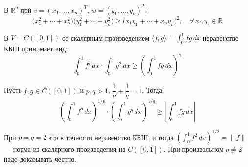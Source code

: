 \begin{examplelist}
    \item
    В $\mathbb{R}^n$ при $v = (x_1,\dots,x_n)^T$, $w = (y_1,\dots,y_n)^T$:
    \[
        \bigl(x_1^2 + \cdots + x_n^2\bigr)\bigl(y_1^2 + \cdots + y_n^2\bigr)
        \ge \bigl(x_1 y_1 + \cdots + x_n y_n\bigr)^2,
        \quad \forall\, x_i, y_i \in \mathbb{R}
    \]

    \item
    В $V = C([0,1])$ со скалярным произведением $\langle f,g\rangle = \int_0^1 fg\,dx$
    неравенство КБШ принимает вид:
    \[
        \int_0^1 f^2\,dx \cdot \int_0^1 g^2\,dx \ge \left(\int_0^1 fg\,dx\right)^2
    \]
\end{examplelist}

\begin{theorem}
    Пусть $f, g \in C([0,1])$ и $p, q > 1$, $\dfrac{1}{p} + \dfrac{1}{q} = 1$. Тогда:
    \[
        \left(\int_0^1 f^p\,dx\right)^{1/p} \cdot \left(\int_0^1 g^q\,dx\right)^{1/q}
        \ge \left|\int_0^1 fg\,dx\right|
    \]
    \begin{remark}
        При $p = q = 2$ это в точности неравенство КБШ, и тогда
        $\left(\int_0^1 f^2\,dx\right)^{1/2} = \|f\|$ --- норма из скалярного произведения на $C([0,1])$.
        При произвольном $p \neq 2$ надо доказывать честно.
    \end{remark}
\end{theorem}
